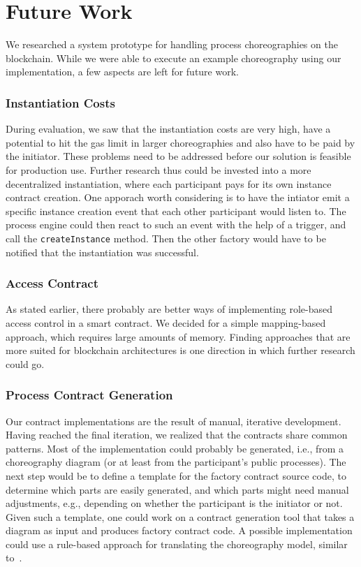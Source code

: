 \documentclass[runningheads]{llncs}
\begin{document}
\section{Future Work} \label{futurework}

We researched a system prototype for handling process choreographies on the blockchain.
While we were able to execute an example choreography using our implementation, a few aspects are left for future work.

\subsubsection{Instantiation Costs}

During evaluation, we saw that the instantiation costs are very high, have a potential to hit the gas limit in larger choreographies and also have to be paid by the initiator.
These problems need to be addressed before our solution is feasible for production use.
Further research thus could be invested into a more decentralized instantiation, where each participant pays for its own instance contract creation.
One apporach worth considering is to have the intiator emit a specific instance creation event that each other participant would listen to.
The process engine could then react to such an event with the help of a trigger, and call the \texttt{createInstance} method.
Then the other factory would have to be notified that the instantiation was successful.

\subsubsection{Access Contract}

As stated earlier, there probably are better ways of implementing role-based access control in a smart contract.
We decided for a simple mapping-based approach, which requires large amounts of memory.
Finding approaches that are more suited for blockchain architectures is one direction in which further research could go.

\subsubsection{Process Contract Generation}

Our contract implementations are the result of manual, iterative development.
Having reached the final iteration, we realized that the contracts share common patterns.
Most of the implementation could probably be generated, i.e., from a choreography diagram (or at least from the participant's public processes).
The next step would be to define a template for the factory contract source code, to determine which parts are easily generated, and which parts might need manual adjustments, e.g., depending on whether the participant is the initiator or not.
Given such a template, one could work on a contract generation tool that takes a diagram as input and produces factory contract code.
A possible implementation could use a rule-based approach for translating the choreography model, similar to~\cite{lopez2017caterpillar}.
\end{document}
